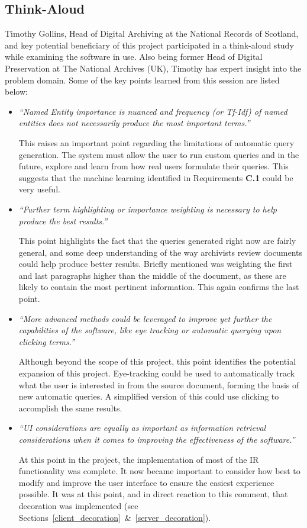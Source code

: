 \documentclass{l4proj}
\begin{document}
\subsection{Think-Aloud}
Timothy Gollins, Head of Digital Archiving at the National Records of Scotland, and key potential beneficiary of this project participated in a think-aloud study while examining the software in use. Also being former Head of Digital Preservation at The National Archives (UK), Timothy has expert insight into the problem domain.
Some of the key points learned from this session are listed below:
\begin{itemize}
\item \textit{``Named Entity importance is nuanced and frequency (or Tf-Idf) of named entities does not necessarily produce the most important terms.''}
\par
This raises an important point regarding the limitations of automatic query generation. The system must allow the user to run custom queries and in the future, explore and learn from how real users formulate their queries. This suggests that the machine learning identified in Requirements \textbf{C.1} could be very useful.
\item \textit{``Further term highlighting or importance weighting is necessary to help produce the best results.''}
\par
This point highlights the fact that the queries generated right now are fairly general, and some deep understanding of the way archivists review documents could help produce better results. Briefly mentioned was weighting the first and last paragraphs higher than the middle of the document, as these are likely to contain the most pertinent information. This again confirms the last point.
\item \textit{``More advanced methods could be leveraged to improve yet further the capabilities of the software, like eye tracking or automatic querying upon clicking terms.''}
\par
Although beyond the scope of this project, this point identifies the potential expansion of this project. Eye-tracking could be used to automatically track what the user is interested in from the source document, forming the basis of new automatic queries. A simplified version of this could use clicking to accomplish the same results.
\item \textit{``UI considerations are equally as important as information retrieval considerations when it comes to improving the effectiveness of the software.''}
\par
At this point in the project, the implementation of most of the IR functionality was complete. It now became important to consider how best to modify and improve the user interface to ensure the easiest experience possible. It was at this point, and in direct reaction to this comment, that decoration was implemented (see Sections~\ref{client_decoration}~\&~\ref{server_decoration}).
\end{itemize}
\end{document}
